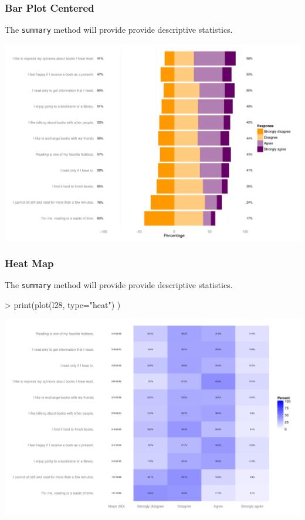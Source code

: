 \documentclass[10pt,slidestop,mathserif,c]{beamer}
\begin{document}
\begin{frame}
	\frametitle{Bar Plot Centered}
    The \texttt{summary} method will provide provide descriptive statistics.
    
\begin{Schunk}
\end{Schunk}
\includegraphics{Slides-likert-bar-centered}
\end{frame}

\begin{frame}
	\frametitle{Heat Map}
    The \texttt{summary} method will provide provide descriptive statistics.
    
\begin{Schunk}
\begin{Sinput}
> print(plot(l28, type="heat")
   )
\end{Sinput}
\end{Schunk}
\includegraphics{Slides-likert-heat}
\end{frame}


\end{document}
